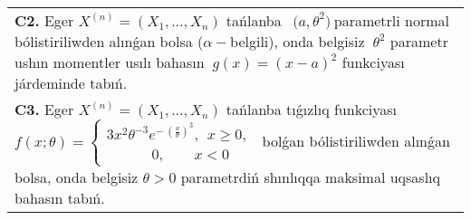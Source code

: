 \documentclass{article}
\begin{document}
\begin{tabular}{m{17cm}}
 \\
\textbf{C2.} 
Eger \(X^{(n)} = \left( X_{1},...,X_{n} \right)\) tańlanba \({\ \ (a,\theta}^{2})\ \)parametrli normal bólistiriliwden alınǵan bolsa (\(\alpha -\)belgili), onda belgisiz \({\ \theta}^{2}\) parametr ushın momentler usılı bahasın \({\ g(x) = (x - a)}^{2}\) funkciyası járdeminde tabıń.
 \\
\textbf{C3.} 
Eger \(X^{(n)} = \left( X_{1},...,X_{n} \right)\) tańlanba tıǵızlıq funkciyası
$f(x;\theta) = \left\{ \begin{matrix}
3x^{2}\theta^{- 3}e^{- \ \left( \frac{x}{\theta} \right)^{3}},\ \ x \geq 0, \\
\ \ \ \ \ \ \ \ \ \ \ \ \ \ 0,\ \ \ \ \ \ \ \ \ x < 0
\end{matrix} \right.\ $
bolǵan bólistiriliwden alınǵan bolsa, onda belgisiz \(\theta > 0\) parametrdiń shınlıqqa maksimal uqsaslıq bahasın tabıń.
 \\

\end{tabular}
\vspace{1cm}
\end{document}
